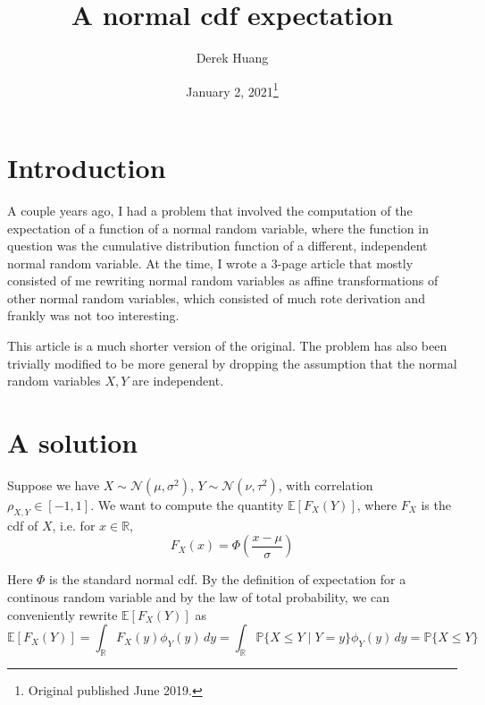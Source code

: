 \documentclass{article}
\title{A normal cdf expectation}
\author{Derek Huang}
\date{January 2, 2021\thanks{Original published June 2019.}}
\numberwithin{equation}{section}
\begin{document}
\maketitle

\section{Introduction}

A couple years ago, I had a problem that involved the computation of the
expectation of a function of a normal random variable, where the function in
question was the cumulative distribution function of a different, independent
normal random variable. At the time, I wrote a 3-page article that mostly
consisted of me rewriting normal random variables as affine transformations of
other normal random variables, which consisted of much rote derivation and
frankly was not too interesting.

\medskip

This article is a much shorter version of the original. The problem has also
been trivially modified to be more general by dropping the assumption that the
normal random variables $ X, Y $ are independent.

\section{A solution}

Suppose we have $ X \sim \mathcal{N}(\mu, \sigma^2) $,
$ Y \sim \mathcal{N}(\nu, \tau^2) $, with correlation
$ \rho_{X, Y} \in [-1, 1] $. We want to compute the quantity
$ \mathbb{E}[F_X(Y)] $, where $ F_X $ is the cdf of $ X $, i.e. for
$ x \in \mathbb{R} $,
\begin{equation*}
    F_X(x) = \Phi\left(\frac{x - \mu}{\sigma}\right)
\end{equation*}

Here $ \Phi $ is the standard normal cdf. By the definition of expectation for a
continous random variable and by the law of total probability, we can
conveniently rewrite $ \mathbb{E}[F_X(Y)] $ as
\begin{equation*}
    \mathbb{E}[F_X(Y)] = \int_\mathbb{R}F_X(y)\phi_Y(y)\,dy =
    \int_\mathbb{R}\mathbb{P}\{X \le Y \mid Y = y\}\phi_Y(y)\,dy =
    \mathbb{P}\{X \le Y\}
\end{equation*}
\end{document}
